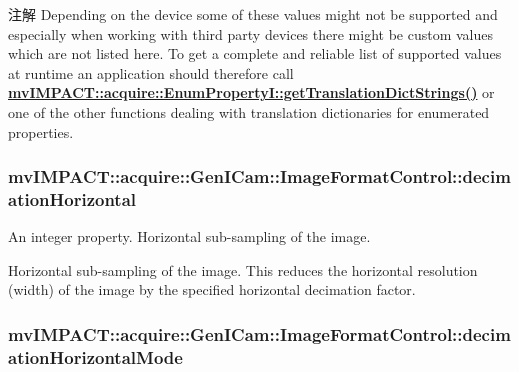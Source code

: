\begin{DoxyNote}{注解}
Depending on the device some of these values might not be supported and especially when working with third party devices there might be custom values which are not listed here. To get a complete and reliable list of supported values at runtime an application should therefore call {\bfseries \hyperlink{classmv_i_m_p_a_c_t_1_1acquire_1_1_enum_property_i_a0ba6ccbf5ee69784d5d0b537924d26b6}{mv\+I\+M\+P\+A\+C\+T\+::acquire\+::\+Enum\+Property\+I\+::get\+Translation\+Dict\+Strings()}} or one of the other functions dealing with translation dictionaries for enumerated properties. 
\end{DoxyNote}
\hypertarget{classmv_i_m_p_a_c_t_1_1acquire_1_1_gen_i_cam_1_1_image_format_control_af3c2ae5e5f9aaea7a762f3cd10ce1ebb}{
\subsubsection[{decimation\+Horizontal}]{ mv\+I\+M\+P\+A\+C\+T\+::acquire\+::\+Gen\+I\+Cam\+::\+Image\+Format\+Control\+::decimation\+Horizontal}}\label{classmv_i_m_p_a_c_t_1_1acquire_1_1_gen_i_cam_1_1_image_format_control_af3c2ae5e5f9aaea7a762f3cd10ce1ebb}


An integer property. Horizontal sub-\/sampling of the image. 

Horizontal sub-\/sampling of the image. This reduces the horizontal resolution (width) of the image by the specified horizontal decimation factor. \hypertarget{classmv_i_m_p_a_c_t_1_1acquire_1_1_gen_i_cam_1_1_image_format_control_ae8eae7ba917fb06636756e081796006b}{
\subsubsection[{decimation\+Horizontal\+Mode}]{ mv\+I\+M\+P\+A\+C\+T\+::acquire\+::\+Gen\+I\+Cam\+::\+Image\+Format\+Control\+::decimation\+Horizontal\+Mode}}\label{classmv_i_m_p_a_c_t_1_1acquire_1_1_gen_i_cam_1_1_image_format_control_ae8eae7ba917fb06636756e081796006b}


